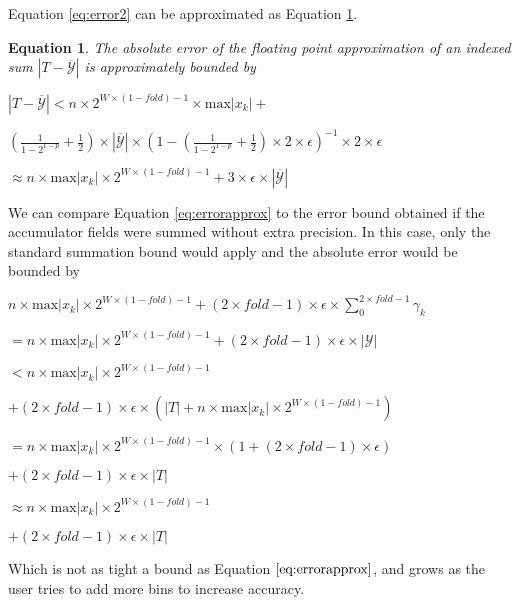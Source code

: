 \documentclass[12pt]{article}
\providecommand{\max}{\ensuremath{\text{max}}}
\theoremstyle{plain}
\newtheorem{eq}{Equation}[section]
\begin{document}
    Equation \ref{eq:error2} can be approximated as Equation \ref{eq:error2approx}.

    \begin{eq} The absolute error of the floating point approximation of an indexed sum $|T - \overline{\mathcal{Y}}|$ is approximately bounded by

      $|T - \overline{\mathcal{Y}}| < n \times 2^{W \times (1 - fold) - 1} \times \max|x_k| + $

      \indent \indent$(\frac{1}{1 - 2^{1 - p}} + \frac{1}{2})\times|\overline{\mathcal{Y}}|\times (1 - (\frac{1}{1 - 2^{1 - p}} + \frac{1}{2})\times 2 \times \epsilon)^{-1} \times 2 \times \epsilon$

      \indent\indent$\approx n \times \max|x_k|\times 2^{W \times (1 - fold) - 1} + 3 \times \epsilon \times |\overline{\mathcal{Y}}|$
      \label{eq:error2approx}
    \end{eq}

    We can compare Equation \ref{eq:errorapprox} to the error bound obtained if the accumulator fields were summed without extra precision. In this case, only the standard summation bound would apply and the absolute error would be bounded by

    $n \times \max|x_k|\times 2^{W \times (1 - fold) - 1} + (2 \times fold - 1) \times \epsilon \times \sum\limits_0^{2 \times fold - 1}\gamma_k$

    \indent\indent $= n \times \max|x_k|\times 2^{W \times (1 - fold) - 1} + (2 \times fold - 1) \times \epsilon \times |\mathcal{Y}|$

    \indent\indent$< n \times \max|x_k|\times 2^{W \times (1 - fold) - 1}$

    \indent\indent\indent$ + (2 \times fold - 1) \times \epsilon \times (|T| + n \times \max|x_k|\times 2^{W \times (1 - fold) - 1})$

    \indent\indent$= n \times \max|x_k|\times 2^{W \times (1 - fold) - 1}\times (1 + (2 \times fold - 1)\times \epsilon)$

    \indent\indent\indent$ + (2 \times fold - 1) \times \epsilon \times |T|$

    \indent\indent$\approx n \times \max|x_k|\times 2^{W \times (1 - fold) - 1}$

    \indent\indent\indent$ + (2 \times fold - 1) \times \epsilon \times |T|$

    Which is not as tight a bound as Equation $\ref{eq:errorapprox}$, and grows as the user tries to add more bins to increase accuracy.
\end{document}
